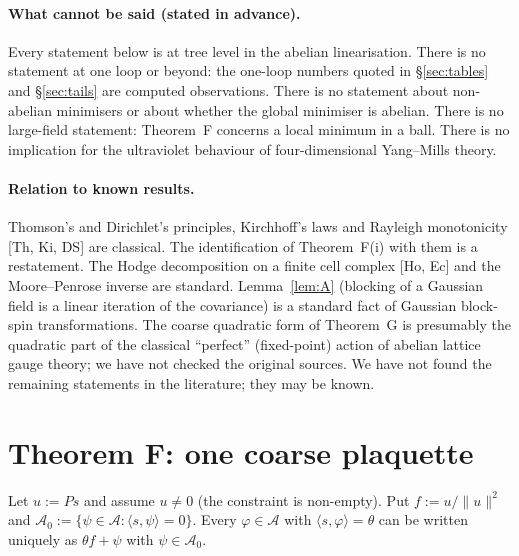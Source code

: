 \documentclass[11pt,a4paper]{article}
\theoremstyle{definition}
\theoremstyle{remark}
\newcommand{\cA}{\mathcal{A}}
\begin{document}
\paragraph{What cannot be said (stated in advance).}
Every statement below is at tree level in the abelian linearisation.
There is no statement at one loop or beyond: the one-loop numbers quoted in \S\ref{sec:tables} and \S\ref{sec:tails} are computed observations.
There is no statement about non-abelian minimisers or about whether the global minimiser is abelian.
There is no large-field statement: Theorem~F concerns a local minimum in a ball.
There is no implication for the ultraviolet behaviour of four-dimensional Yang--Mills theory.

\paragraph{Relation to known results.}
Thomson's and Dirichlet's principles, Kirchhoff's laws and Rayleigh monotonicity [Th, Ki, DS] are classical.
The identification of Theorem~F(i) with them is a restatement.
The Hodge decomposition on a finite cell complex [Ho, Ec] and the Moore--Penrose inverse are standard.
Lemma~\ref{lem:A} (blocking of a Gaussian field is a linear iteration of the covariance) is a standard fact of Gaussian block-spin transformations.
The coarse quadratic form of Theorem~G is presumably the quadratic part of the classical ``perfect'' (fixed-point) action of abelian lattice gauge theory; we have not checked the original sources.
We have not found the remaining statements in the literature; they may be known.

\section{Theorem F: one coarse plaquette}\label{sec:F}

Let $u:=Ps$ and assume $u\ne0$ (the constraint is non-empty). Put $f:=u/\|u\|^2$ and $\cA_0:=\{\psi\in\cA:\langle s,\psi\rangle=0\}$.
Every $\varphi\in\cA$ with $\langle s,\varphi\rangle=\theta$ can be written uniquely as $\theta f+\psi$ with $\psi\in\cA_0$.
\end{document}
